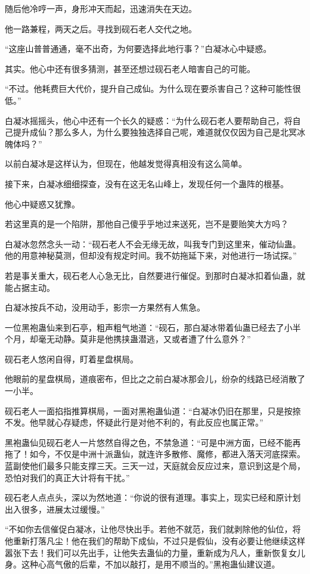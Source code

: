 \begin{this_body}
随后他冷哼一声，身形冲天而起，迅速消失在天边。

他一路兼程，两天之后。寻找到砚石老人交代之地。

“这座山普普通通，毫不出奇，为何要选择此地行事？”白凝冰心中疑惑。

其实。他心中还有很多猜测，甚至还想过砚石老人暗害自己的可能。

“不过。他耗费巨大代价，提升自己成仙。为什么现在要杀害自己？这种可能性很低。”

白凝冰摇摇头，他心中还有一个长久的疑惑：“为什么砚石老人要帮助自己，将自己提升成仙？那么多人，为什么要独独选择自己呢，难道就仅仅因为自己是北冥冰魄体吗？”

以前白凝冰是这样认为，但现在，他越发觉得真相没有这么简单。

接下来，白凝冰细细探查，没有在这无名山峰上，发现任何一个蛊阵的根基。

他心中疑惑又犹豫。

若这里真的是一个陷阱，那他自己傻乎乎地过来送死，岂不是要贻笑大方吗？

白凝冰忽然念头一动：“砚石老人不会无缘无故，叫我专门到这里来，催动仙蛊。他的用意神秘莫测，但却没有规定时间。我不妨拖延下来，对他进行一场试探。”

若是事关重大，砚石老人心急无比，自然要进行催促。到那时白凝冰扣着仙蛊，就能占据主动。

白凝冰按兵不动，没用动手，影宗一方果然有人焦急。

一位黑袍蛊仙来到石亭，粗声粗气地道：“砚石，那白凝冰带着仙蛊已经去了小半个月，却毫无动静。莫非是他携挟蛊潜逃，又或者遭了什么意外？”

砚石老人悠闲自得，盯着星盘棋局。

他眼前的星盘棋局，道痕密布，但比之之前白凝冰那会儿，纷杂的线路已经消散了一小半。

砚石老人一面掐指推算棋局，一面对黑袍蛊仙道：“白凝冰仍旧在那里，只是按捺不发。他早就心存疑虑，怀疑此行是对他不利的，有此反应也属正常。”

黑袍蛊仙见砚石老人一片悠然自得之色，不禁急道：“可是中洲方面，已经不能再拖了！如今，不仅是中洲十派蛊仙，就连许多散修、魔修，都进入落天河底探索。蓝副使他们最多只能支撑三天。三天一过，天庭就会反应过来，意识到这是个局，恐怕对我们的真正大计将有干扰。”

砚石老人点点头，深以为然地道：“你说的很有道理。事实上，现实已经和原计划出入很多，进展太过缓慢。”

“不如你去信催促白凝冰，让他尽快出手。若他不就范，我们就剥除他的仙位，将他重新打落凡尘！他在我们的帮助下成仙，不过只是假仙，没有必要让他继续这样嚣张下去！我们可以先出手，让他失去蛊仙的力量，重新成为凡人，重新恢复女儿身。这种心高气傲的后辈，不加以敲打，是用不顺当的。”黑袍蛊仙建议道。


\end{this_body}
